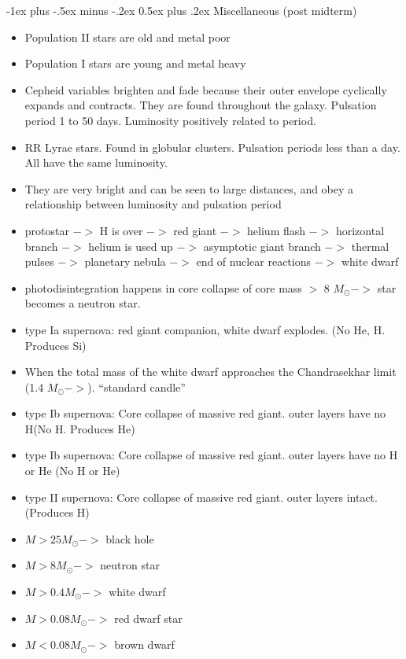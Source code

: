 \documentclass[10pt,landscape]{article}
\makeatletter
\renewcommand{\section}{\@startsection{section}{1}{0mm}%
                                {-1ex plus -.5ex minus -.2ex}%
                                {0.5ex plus .2ex}%
                                {\normalfont\large\bfseries}}
\makeatother
\begin{document}
\begin{multicols}{3}
\section{Miscellaneous (post midterm)}
\begin{itemize}
    \item Population II stars are old and metal poor
    \item Population I stars are young and metal heavy
    \item Cepheid variables brighten and fade because their outer envelope cyclically expands and contracts. They are found throughout the galaxy. Pulsation period 1 to 50 days. Luminosity positively related to period.
    \item RR Lyrae stars. Found in globular clusters. Pulsation periods less than a day. All have the same luminosity.
    \item They are very bright and can be seen to large distances, and obey a relationship between luminosity and pulsation period
    \item protostar $->$ H is over $->$ red giant $->$ helium flash $->$ horizontal branch $->$ helium is used up $->$ asymptotic giant branch $->$ thermal pulses $->$ planetary nebula $->$ end of nuclear reactions $->$ white dwarf
    \item photodisintegration happens in core collapse of core mass $>$ 8 $M_\odot ->$ star becomes a neutron star.
    \item type Ia supernova: red giant companion, white dwarf explodes. (No He, H. Produces Si)
    \item When the total mass of the white dwarf approaches the
Chandrasekhar limit (1.4 $M_\odot ->$). “standard candle”
    \item type Ib supernova: Core collapse of massive red giant. outer layers have no H(No H. Produces He)
    \item type Ib supernova: Core collapse of massive red giant. outer layers have no H or He (No H or He)
    \item type II supernova: Core collapse of massive red giant. outer layers intact. (Produces H)
    \item $M > 25 M_\odot ->$ black hole
    \item $M > 8 M_\odot ->$ neutron star
    \item $M > 0.4 M_\odot ->$ white dwarf
    \item $M > 0.08 M_\odot ->$ red dwarf star
    \item $M < 0.08 M_\odot ->$ brown dwarf

\end{itemize}
\end{multicols}
\end{document}
